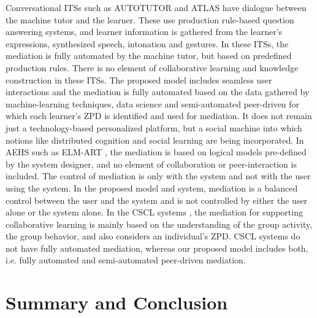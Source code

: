 \begin{multicols}{2}
Conversational ITSs such as AUTOTUTOR \cite{art2-key19} and ATLAS \cite{art2-key50} have dialogue between the machine tutor and the learner. These use production rule-based question answering systems, and learner information is gathered from the learner’s expressions, synthesized speech, intonation and gestures. In these ITSs, the mediation is fully automated by the machine tutor, but based on predefined production rules. There is no element of collaborative learning and knowledge construction in these ITSs. The proposed model includes seamless user interactions and the mediation is fully automated based on the data gathered by machine-learning techniques, data science and semi-automated peer-driven for which each learner’s ZPD is identified and used for mediation. It does not remain just a technology-based personalized platform, but a social machine into which notions like distributed cognition and social learning are being incorporated. In AEHS such as ELM-ART \cite{art2-key53}, the mediation is based on logical models pre-defined by the system designer, and no element of collaboration or peer-interaction is included. The control of mediation is only with the system and not with the user using the system. In the proposed model and system, mediation is a balanced control between the user and the system and is not controlled by either the user alone or the system alone. In the CSCL systems \cite{art2-key48}, the mediation for supporting collaborative learning is mainly based on the understanding of the group activity, the group behavior, and also considers an individual’s ZPD. CSCL systems do not have fully automated mediation, whereas our proposed model includes both, i.e. fully automated and semi-automated peer-driven mediation.

\bigskip
\bigskip
\medskip

\section{Summary and Conclusion}


\end{multicols}
